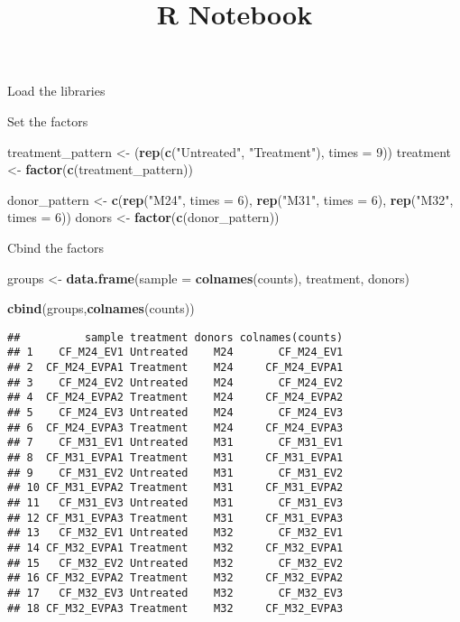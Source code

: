 \documentclass[
]{article}
\title{R Notebook}
\author{}
\date{\vspace{-2.5em}}
\newenvironment{Shaded}{\begin{snugshade}}{\end{snugshade}}
\newcommand{\AttributeTok}[1]{\textcolor[rgb]{0.13,0.29,0.53}{#1}}
\newcommand{\DecValTok}[1]{\textcolor[rgb]{0.00,0.00,0.81}{#1}}
\newcommand{\FunctionTok}[1]{\textcolor[rgb]{0.13,0.29,0.53}{\textbf{#1}}}
\newcommand{\NormalTok}[1]{#1}
\newcommand{\OtherTok}[1]{\textcolor[rgb]{0.56,0.35,0.01}{#1}}
\newcommand{\StringTok}[1]{\textcolor[rgb]{0.31,0.60,0.02}{#1}}
\begin{document}
\maketitle

{
\setcounter{tocdepth}{2}
\tableofcontents
}
Load the libraries

Set the factors

\begin{Shaded}
\begin{Highlighting}[]
\NormalTok{treatment\_pattern }\OtherTok{\textless{}{-}}\NormalTok{ (}\FunctionTok{rep}\NormalTok{(}\FunctionTok{c}\NormalTok{(}\StringTok{"Untreated"}\NormalTok{, }\StringTok{"Treatment"}\NormalTok{), }\AttributeTok{times =} \DecValTok{9}\NormalTok{))}
\NormalTok{treatment }\OtherTok{\textless{}{-}} \FunctionTok{factor}\NormalTok{(}\FunctionTok{c}\NormalTok{(treatment\_pattern))}

\NormalTok{donor\_pattern }\OtherTok{\textless{}{-}} \FunctionTok{c}\NormalTok{(}\FunctionTok{rep}\NormalTok{(}\StringTok{"M24"}\NormalTok{, }\AttributeTok{times =} \DecValTok{6}\NormalTok{), }\FunctionTok{rep}\NormalTok{(}\StringTok{"M31"}\NormalTok{, }\AttributeTok{times =} \DecValTok{6}\NormalTok{), }\FunctionTok{rep}\NormalTok{(}\StringTok{"M32"}\NormalTok{, }\AttributeTok{times =} \DecValTok{6}\NormalTok{))}
\NormalTok{donors }\OtherTok{\textless{}{-}} \FunctionTok{factor}\NormalTok{(}\FunctionTok{c}\NormalTok{(donor\_pattern))}
\end{Highlighting}
\end{Shaded}

Cbind the factors

\begin{Shaded}
\begin{Highlighting}[]
\NormalTok{groups }\OtherTok{\textless{}{-}} \FunctionTok{data.frame}\NormalTok{(}\AttributeTok{sample =} \FunctionTok{colnames}\NormalTok{(counts), treatment, donors)}

\FunctionTok{cbind}\NormalTok{(groups,}\FunctionTok{colnames}\NormalTok{(counts))}
\end{Highlighting}
\end{Shaded}

\begin{verbatim}
##          sample treatment donors colnames(counts)
## 1    CF_M24_EV1 Untreated    M24       CF_M24_EV1
## 2  CF_M24_EVPA1 Treatment    M24     CF_M24_EVPA1
## 3    CF_M24_EV2 Untreated    M24       CF_M24_EV2
## 4  CF_M24_EVPA2 Treatment    M24     CF_M24_EVPA2
## 5    CF_M24_EV3 Untreated    M24       CF_M24_EV3
## 6  CF_M24_EVPA3 Treatment    M24     CF_M24_EVPA3
## 7    CF_M31_EV1 Untreated    M31       CF_M31_EV1
## 8  CF_M31_EVPA1 Treatment    M31     CF_M31_EVPA1
## 9    CF_M31_EV2 Untreated    M31       CF_M31_EV2
## 10 CF_M31_EVPA2 Treatment    M31     CF_M31_EVPA2
## 11   CF_M31_EV3 Untreated    M31       CF_M31_EV3
## 12 CF_M31_EVPA3 Treatment    M31     CF_M31_EVPA3
## 13   CF_M32_EV1 Untreated    M32       CF_M32_EV1
## 14 CF_M32_EVPA1 Treatment    M32     CF_M32_EVPA1
## 15   CF_M32_EV2 Untreated    M32       CF_M32_EV2
## 16 CF_M32_EVPA2 Treatment    M32     CF_M32_EVPA2
## 17   CF_M32_EV3 Untreated    M32       CF_M32_EV3
## 18 CF_M32_EVPA3 Treatment    M32     CF_M32_EVPA3
\end{verbatim}
\end{document}
